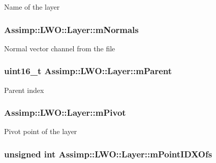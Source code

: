 Name of the layer \hypertarget{struct_assimp_1_1_l_w_o_1_1_layer_ad0f4a899482d0ed02defdc88beee9461}{
\subsubsection[{m\+Normals}]{ Assimp\+::\+L\+W\+O\+::\+Layer\+::m\+Normals}}\label{struct_assimp_1_1_l_w_o_1_1_layer_ad0f4a899482d0ed02defdc88beee9461}
Normal vector channel from the file \hypertarget{struct_assimp_1_1_l_w_o_1_1_layer_ae2256c4409c6ba4bbc14fcd614cf680b}{
\subsubsection[{m\+Parent}]{\setlength{\rightskip}{0pt plus 5cm}uint16\+\_\+t Assimp\+::\+L\+W\+O\+::\+Layer\+::m\+Parent}}\label{struct_assimp_1_1_l_w_o_1_1_layer_ae2256c4409c6ba4bbc14fcd614cf680b}
Parent index \hypertarget{struct_assimp_1_1_l_w_o_1_1_layer_ab40e9864853c0c8e8b16a88c3d297b4b}{
\subsubsection[{m\+Pivot}]{ Assimp\+::\+L\+W\+O\+::\+Layer\+::m\+Pivot}}\label{struct_assimp_1_1_l_w_o_1_1_layer_ab40e9864853c0c8e8b16a88c3d297b4b}
Pivot point of the layer \hypertarget{struct_assimp_1_1_l_w_o_1_1_layer_a8ce2442b34e0b75f32bf33974c358029}{
\subsubsection[{m\+Point\+I\+D\+X\+Ofs}]{\setlength{\rightskip}{0pt plus 5cm}unsigned int Assimp\+::\+L\+W\+O\+::\+Layer\+::m\+Point\+I\+D\+X\+Ofs}}\label{struct_assimp_1_1_l_w_o_1_1_layer_a8ce2442b34e0b75f32bf33974c358029}
